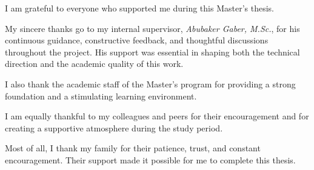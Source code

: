 I am grateful to everyone who supported me during this Master's thesis.

My sincere thanks go to my internal supervisor, \textit{Abubaker Gaber, M.Sc.}, for his continuous guidance, constructive feedback, and thoughtful discussions throughout the project. His support was essential in shaping both the technical direction and the academic quality of this work.

I also thank the academic staff of the Master's program for providing a strong foundation and a stimulating learning environment.

I am equally thankful to my colleagues and peers for their encouragement and for creating a supportive atmosphere during the study period.

Most of all, I thank my family for their patience, trust, and constant encouragement. Their support made it possible for me to complete this thesis.
